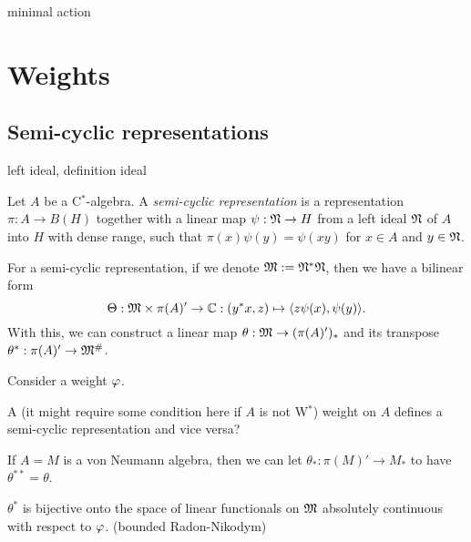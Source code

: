 \documentclass{../../large}
\begin{document}
minimal action












\chapter{Weights}



\section{Semi-cyclic representations}


\begin{prb}
left ideal, definition ideal
\end{prb}


\begin{prb}
Let $A$ be a C$^*$-algebra.
A \emph{semi-cyclic representation} is a representation $\pi:A\to B(H)$ together with a linear map $\psi:\mathfrak{N}\to H$ from a left ideal $\mathfrak{N}$ of $A$ into $H$ with dense range, such that $\pi(x)\psi(y)=\psi(xy)$ for $x\in A$ and $y\in\mathfrak{N}$.

For a semi-cyclic representation, if we denote $\mathfrak{M}:=\mathfrak{N}^*\mathfrak{N}$, then we have a bilinear form
\[\Theta:\mathfrak{M}\times\pi(A)'\to\mathbb{C}:(y^*x,z)\mapsto\langle z\psi(x),\psi(y)\rangle.\]
With this, we can construct a linear map $\theta:\mathfrak{M}\to(\pi(A)')_*$ and its transpose $\theta^*:\pi(A)'\to\mathfrak{M}^\#$.

Consider a weight $\varphi$.
\begin{parts}
\item A (it might require some condition here if $A$ is not W$^*$) weight on $A$ defines a semi-cyclic representation and vice versa?
\item If $A=M$ is a von Neumann algebra, then we can let $\theta_*:\pi(M)'\to M_*$ to have $\theta^{**}=\theta$.
\item $\theta^*$ is bijective onto the space of linear functionals on $\mathfrak{M}$ absolutely continuous with respect to $\varphi$. (bounded Radon-Nikodym)
\end{parts}
\end{prb}
\end{document}
